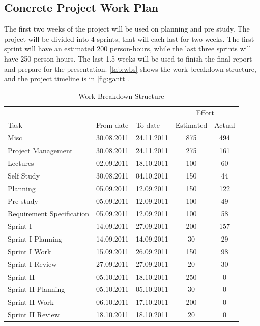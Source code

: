 \subsection{Concrete Project Work Plan}
The first two weeks of the project will be used on planning and pre study.
The project will be divided into 4 sprints, that will each last for two weeks.
The first sprint will have an estimated 200 person-hours, while the last three
sprints will have 250 person-hours. The last 1.5 weeks will be used to finish
the final report and prepare for the presentation. \autoref{tab:wbs} shows the
work breakdown structure, and the project timeline is in \autoref{fig:gantt}.

\begin{table}[!htb] \footnotesize \center
\caption{Work Breakdown Structure\label{tab:wbs}}
\begin{tabular}{l l l c c}
	\toprule
	& & & \multicolumn{2}{c}{Effort} \\
	\cmidrule(r){4-5}
	Task & From date & To date & Estimated & Actual  \\
	\midrule
	Misc & 30.08.2011 & 24.11.2011 & 875 & 494  \\
	\midrule
	Project Management & 30.08.2011 & 24.11.2011 & 275 &161 \\
	Lectures & 02.09.2011 & 18.10.2011 & 100 & 60 \\
	Self Study & 30.08.2011 & 04.10.2011 & 150 & 44 \\
	Planning & 05.09.2011 & 12.09.2011 & 150 & 122 \\
	Pre-study & 05.09.2011 & 12.09.2011 & 100 & 49 \\
	Requirement Specification & 05.09.2011 & 12.09.2011 & 100 & 58 \\
	\midrule
	Sprint I & 14.09.2011 & 27.09.2011 & 200 & 157 \\
	\midrule
	Sprint I Planning & 14.09.2011 & 14.09.2011 & 30 & 29 \\
	Sprint I Work & 15.09.2011 & 26.09.2011 & 150 & 98 \\
	Sprint I Review & 27.09.2011 & 27.09.2011 & 20 & 30 \\
	\midrule
	Sprint II & 05.10.2011 & 18.10.2011 & 250 & 0 \\
	\midrule
	Sprint II Planning & 05.10.2011 & 05.10.2011 & 30 & 0 \\
	Sprint II Work & 06.10.2011 & 17.10.2011 & 200 & 0 \\
	Sprint II Review & 18.10.2011 & 18.10.2011 & 20 & 0 \\

\end{tabular}
\end{table}
